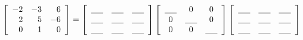 \begin{myexb}[\bd{b}]
	 $\left[ \begin{array}{rrr} -2 & -3 & 6 \\ 2 & 5 & -6 \\ 0 & 1 & 0 \end{array} \right]  = \left[ \begin{array}{ccc} \underline{\hspace{.2in} }  &  \underline{\hspace{.2in} } & \underline{\hspace{.2in} }  \\	 \underline{\hspace{.2in} }  &  \underline{\hspace{.2in} } & \underline{\hspace{.2in} } \\ \underline{\hspace{.2in} }  &  \underline{\hspace{.2in} } & \underline{\hspace{.2in} }\\
	 \end{array} \right]  \left[ \begin{array}{ccc} \underline{\hspace{.2in} }  &  0 & 0  \\	 0  &  \underline{\hspace{.2in} } & 0 \\ 0  &  0 & \underline{\hspace{.2in} }\\
	 \end{array} \right]\left[ \begin{array}{ccc} \underline{\hspace{.2in} }  &  \underline{\hspace{.2in} } & \underline{\hspace{.2in} }  \\	 \underline{\hspace{.2in} }  &  \underline{\hspace{.2in} } & \underline{\hspace{.2in} } \\ \underline{\hspace{.2in} }  &  \underline{\hspace{.2in} } & \underline{\hspace{.2in} }\\
	 \end{array} \right]$
\end{myexb}

\vspace{.5cm}

